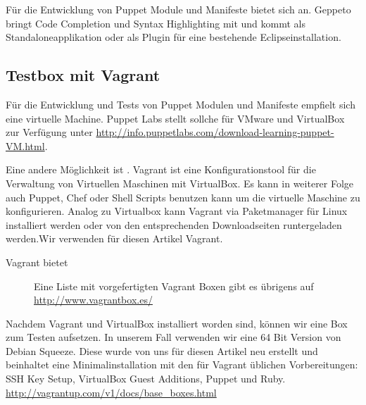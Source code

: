 \documentclass[12pt,a4paper,ngerman]{article}
\newcommand{\reffig}[1]{, siehe. Abbildung~\ref{#1}}
\begin{document}
Für die Entwicklung von Puppet Module und Manifeste bietet sich \cite{geppeto} an. Geppeto bringt Code Completion und Syntax Highlighting mit und kommt als Standaloneapplikation oder als Plugin für eine bestehende Eclipseinstallation. 





\subsection{Testbox mit Vagrant}
Für die Entwicklung und Tests von Puppet Modulen und Manifeste empfielt sich eine virtuelle Machine. Puppet Labs stellt sollche für VMware und VirtualBox zur Verfügung unter \url{http://info.puppetlabs.com/download-learning-puppet-VM.html}. 

Eine andere Möglichkeit ist \cite{vagrant}. Vagrant ist eine Konfigurationstool für die Verwaltung von Virtuellen Maschinen mit VirtualBox. Es kann in weiterer Folge auch Puppet, Chef oder Shell Scripts benutzen kann um die virtuelle Maschine zu konfigurieren. Analog zu Virtualbox kann Vagrant via Paketmanager für Linux installiert werden oder von den entsprechenden Downloadseiten runtergeladen werden.Wir verwenden für diesen Artikel Vagrant. 

Vagrant bietet 
\begin{figure}
\vspace{-15pt}
\begin{boxedminipage}{5cm}
Eine Liste mit vorgefertigten Vagrant Boxen gibt es übrigens auf \url{http://www.vagrantbox.es/}
\end{boxedminipage}
\vspace{-15pt}
\end{figure}

Nachdem Vagrant und VirtualBox installiert worden sind, können wir eine Box zum Testen aufsetzen. In unserem Fall verwenden wir eine 64 Bit Version von Debian Squeeze. Diese wurde von uns für diesen Artikel neu erstellt und beinhaltet eine Minimalinstallation mit den für Vagrant üblichen Vorbereitungen: SSH Key Setup, VirtualBox Guest Additions, Puppet und Ruby. \url{http://vagrantup.com/v1/docs/base_boxes.html}
\end{document}

